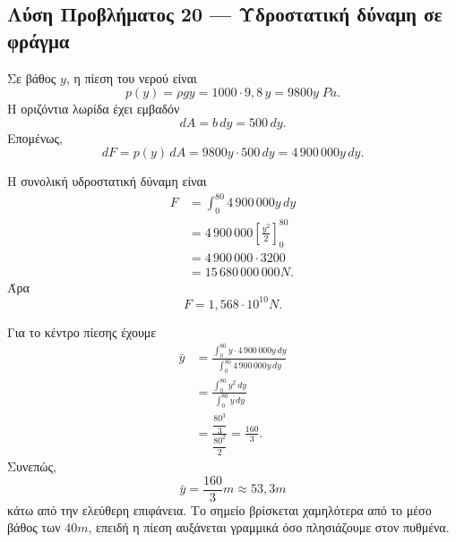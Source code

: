 \subsection*{Λύση Προβλήματος 20 --- Υδροστατική δύναμη σε φράγμα}

\begin{alist}
  \item Σε βάθος $y$, η πίεση του νερού είναι
        \[
          p(y)=\rho gy=1000\cdot9{,}8\,y=9800y\;\si{Pa}.
        \]
        Η οριζόντια λωρίδα έχει εμβαδόν
        \[
          dA=b\,dy=500\,dy.
        \]
        Επομένως,
        \[
          dF=p(y)\,dA
             =9800y\cdot500\,dy
             ={4\,900\,000y\,dy}.
        \]

  \item Η συνολική υδροστατική δύναμη είναι
        \begin{align*}
          F
          &=\int_0^{80}4\,900\,000y\,dy\\
          &=4\,900\,000
            \left[\frac{y^2}{2}\right]_0^{80}\\
          &=4\,900\,000\cdot3200\\
          &=15\,680\,000\,000\si{N}.
        \end{align*}
        Άρα
        \[
          {F=1{,}568\cdot10^{10}\si{N}}.
        \]

  \item Για το κέντρο πίεσης έχουμε
        \begin{align*}
          \bar y
          &=\frac{\displaystyle
              \int_0^{80}y\cdot4\,900\,000y\,dy}
             {\displaystyle
              \int_0^{80}4\,900\,000y\,dy}\\
          &=\frac{\displaystyle\int_0^{80}y^2\,dy}
                  {\displaystyle\int_0^{80}y\,dy}\\
          &=\frac{\dfrac{80^3}{3}}{\dfrac{80^2}{2}}
           =\frac{160}{3}.
        \end{align*}
        Συνεπώς,
        \[
          {\bar y=\frac{160}{3}\si{m}
          \approx53{,}3\si{m}}
        \]
        κάτω από την ελεύθερη επιφάνεια. Το σημείο βρίσκεται χαμηλότερα
        από το μέσο βάθος των $40\si{m}$, επειδή η πίεση αυξάνεται
        γραμμικά όσο πλησιάζουμε στον πυθμένα.
\end{alist}

